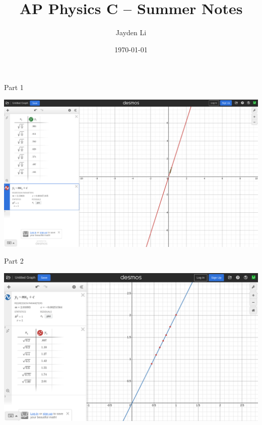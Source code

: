 \documentclass{article}
\title{\vspace*{-40pt}AP Physics C -- Summer Notes}
\author{Jayden Li}
\date{\today}
\begin{document}
\fontsize{11pt}{12pt}\selectfont
\setlength{\abovedisplayskip}{\abovedisplayskip/2}
\setlength{\belowdisplayskip}{\belowdisplayskip/2}
\setlength{\parindent}{0pt}
\setlength{\parskip}{2ex plus 0.5ex minus 0.2ex}



\begin{center}
	Part 1

	\includegraphics[width=\linewidth]{Screenshot 2025-09-05 at 21-05-25 Desmos Graphing Calculator.png}

	Part 2

	\includegraphics[width=\linewidth]{Screenshot 2025-09-05 at 09-21-45 Desmos Graphing Calculator.png}
\end{center}
\end{document}
